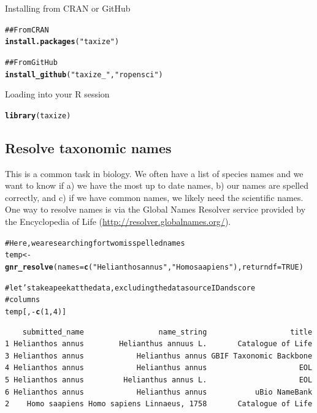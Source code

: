 \documentclass[letterpaper,superscriptaddress,showkeys,longbibliography]{revtex4-1}\usepackage{graphicx, color}
\makeatletter
\newcommand{\hlfunctioncall}[1]{\textcolor[rgb]{0.501960784313725,0,0.329411764705882}{\textbf{#1}}}%
\newcommand{\hlstring}[1]{\textcolor[rgb]{0.6,0.6,1}{#1}}%
\newcommand{\hlcomment}[1]{\textcolor[rgb]{0.180392156862745,0.6,0.341176470588235}{#1}}%
\newenvironment{kframe}{%
 \def\at@end@of@kframe{}%
 \ifinner\ifhmode%
  \def\at@end@of@kframe{\end{minipage}}%
  \begin{minipage}{\columnwidth}%
 \fi\fi%
 \def\FrameCommand##1{\hskip\@totalleftmargin \hskip-\fboxsep
 \colorbox{shadecolor}{##1}\hskip-\fboxsep
     \hskip-\linewidth \hskip-\@totalleftmargin \hskip\columnwidth}%
 \MakeFramed {\advance\hsize-\width
   \@totalleftmargin\z@ \linewidth\hsize
   \@setminipage}}%
 {\par\unskip\endMakeFramed%
 \at@end@of@kframe}
\newenvironment{knitrout}{}{} %
\makeatother
\begin{document}
Installing from CRAN or GitHub

\begin{knitrout}
\color{fgcolor}\begin{kframe}
\begin{alltt}
\hlcomment{## From CRAN}
\hlfunctioncall{install.packages}(\hlstring{"taxize"})

\hlcomment{## From GitHub}
\hlfunctioncall{install_github}(\hlstring{"taxize_"}, \hlstring{"ropensci"})
\end{alltt}
\end{kframe}
\end{knitrout}


Loading into your R session

\begin{knitrout}
\color{fgcolor}\begin{kframe}
\begin{alltt}
\hlfunctioncall{library}(taxize)
\end{alltt}
\end{kframe}
\end{knitrout}



\subsection{Resolve taxonomic names}

This is a common task in biology. We often have a list of species names and we want to know if a) we have the most up to date names, b) our names are spelled correctly, and c) if we have common names, we likely need the scientific names. One way to resolve names is via the Global Names Resolver service provided by the Encyclopedia of Life (\url{http://resolver.globalnames.org/}).

\begin{knitrout}
\color{fgcolor}\begin{kframe}
\begin{alltt}
\hlcomment{# Here, we are searching for two misspelled names}
temp <- \hlfunctioncall{gnr_resolve}(names = \hlfunctioncall{c}(\hlstring{"Helianthos annus"}, \hlstring{"Homo saapiens"}), returndf = TRUE)

\hlcomment{# let's take a peek at the data, excluding the data source ID and score}
\hlcomment{# columns}
temp[, -\hlfunctioncall{c}(1, 4)]
\end{alltt}
\begin{verbatim}
    submitted_name                 name_string                   title
1 Helianthos annus        Helianthus annuus L.       Catalogue of Life
3 Helianthos annus            Helianthus annus GBIF Taxonomic Backbone
4 Helianthos annus            Helianthus annus                     EOL
5 Helianthos annus         Helianthus annus L.                     EOL
6 Helianthos annus            Helianthus annus           uBio NameBank
2    Homo saapiens Homo sapiens Linnaeus, 1758       Catalogue of Life
\end{verbatim}
\end{kframe}
\end{knitrout}
\end{document}
